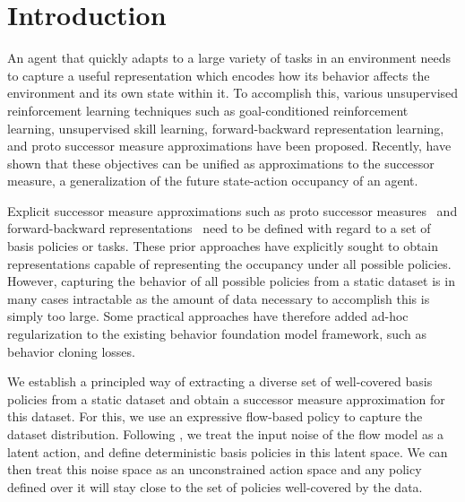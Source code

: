 \section{Introduction}

An agent that quickly adapts to a large variety of tasks in an environment needs to capture a useful representation which encodes how its behavior affects the environment and its own state within it.
To accomplish this, various unsupervised reinforcement learning techniques such as goal-conditioned reinforcement learning, unsupervised skill learning, forward-backward representation learning, and proto successor measure approximations have been proposed.
Recently, \citet{agarwal-rlj25a} have shown that these objectives can be unified as approximations to the successor measure, a generalization of the future state-action occupancy of an agent.

Explicit successor measure approximations such as proto successor measures~\citep{agarwal-arxiv25a} and forward-backward representations~\citep{touati-neurips21a,touati2023does,trinzoni-iclr25a,bagatella-iclr26a} need to be defined with regard to a set of basis policies or tasks.
These prior approaches have explicitly sought to obtain representations capable of representing the occupancy under all possible policies.
However, capturing the behavior of all possible policies from a static dataset is in many cases intractable as the amount of data necessary to accomplish this is simply too large.
Some practical approaches have therefore added ad-hoc regularization to the existing behavior foundation model framework, such as behavior cloning losses. %

We establish a principled way of extracting a diverse set of well-covered basis policies from a static dataset and obtain a successor measure approximation for this dataset.
For this, we use an expressive flow-based policy to capture the dataset distribution. 
Following \citet{wagenmaker}, we treat the input noise of the flow model as a latent action, and define deterministic basis policies in this latent space.
We can then treat this noise space as an unconstrained action space and any policy defined over it will stay close to the set of policies well-covered by the data.

